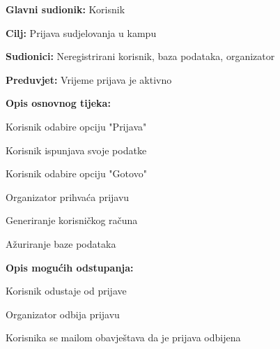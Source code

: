 					\noindent {}
					\begin{packed_item}
						
						\item \textbf{Glavni sudionik: } Korisnik
						\item  \textbf{Cilj:} Prijava sudjelovanja u kampu
						\item  \textbf{Sudionici:} Neregistrirani korisnik, baza podataka, organizator
						\item  \textbf{Preduvjet:} Vrijeme prijava je aktivno
						\item  \textbf{Opis osnovnog tijeka:} 
						
						\item[] \begin{packed_enum}
							
							\item Korisnik odabire opciju "Prijava"
							\item Korisnik ispunjava svoje podatke
							\item Korisnik odabire opciju "Gotovo"
							\item Organizator prihvaća prijavu
							\item Generiranje korisničkog računa
							\item Ažuriranje baze podataka
							
						\end{packed_enum}
						
						\item  \textbf{Opis mogućih odstupanja:}
						
						\item[] \begin{packed_item}
							
							\item[2.a] Korisnik odustaje od prijave
							\item[4.a] Organizator odbija prijavu
							\item[] \begin{packed_enum}
								
								\item[1.] Korisnika se mailom obavještava da je prijava odbijena
							\end{packed_enum}
						\end{packed_item}
					\end{packed_item}
					
